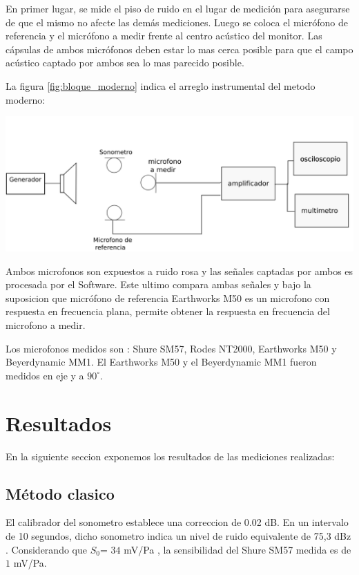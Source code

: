 \documentclass[]{article}
\makeatletter
\newenvironment{figurehere}   %
  {\def\@captype{figure}}   %
  {\par\medskip}
  {}              %
\makeatother
\begin{document}
\begin{multicols}{2}
En primer lugar, se mide el piso de ruido en el lugar de medición para asegurarse
de que el mismo no afecte las demás mediciones. Luego se coloca el micrófono de
referencia y el micrófono a medir frente al centro acústico del monitor.
Las cápsulas de ambos micrófonos deben estar lo mas cerca posible para que el
campo acústico captado por ambos sea lo mas parecido posible.

La figura \ref{fig:bloque_moderno} indica el arreglo instrumental del metodo
moderno:

\begin{figurehere}
 \centering
 \includegraphics[width=\linewidth]{blockdiag}
 \label{fig:bloque_clasico}
\end{figurehere}

Ambos microfonos son expuestos a ruido rosa y las señales captadas por ambos
es procesada por el Software. Este ultimo compara ambas señales y bajo la
suposicion que micrófono de referencia Earthworks M50 es un microfono con
respuesta en frecuencia plana, permite obtener la respuesta en frecuencia del
microfono a medir.

Los microfonos medidos son : Shure SM57, Rodes NT2000, Earthworks M50 y
Beyerdynamic MM1. El Earthworks M50 y el Beyerdynamic MM1 fueron medidos en eje
y a $90^\circ$.

\section{Resultados}
En la siguiente seccion exponemos los resultados de las mediciones realizadas:
\subsection{Método clasico}

El calibrador del sonometro establece una correccion de 0.02 dB. En un intervalo
de 10 segundos, dicho sonometro indica un nivel de ruido equivalente de 75,3 dBz
. Considerando que $S_0$= $34$ mV/Pa , la sensibilidad del Shure SM57 medida es de
$1$ mV/Pa.


\end{multicols}
\end{document}
